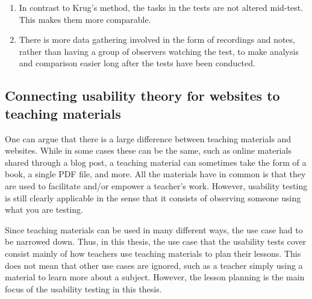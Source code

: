 \begin{enumerate}
	\item In contrast to Krug's method, the tasks in the tests are not altered mid-test. This makes them more comparable.
	\item There is more data gathering involved in the form of recordings and notes, rather than having a group of observers watching the test, to make analysis and comparison easier long after the tests have been conducted.
\end{enumerate}

\subsection{Connecting usability theory for websites to teaching materials}

One can argue that there is a large difference between teaching materials and websites. While in some cases these can be the same, such as online materials shared through a blog post, a teaching material can sometimes take the form of a book, a single PDF file, and more. All the materials have in common is that they are used to facilitate and/or empower a teacher's work. However, usability testing is still clearly applicable in the sense that it consists of observing someone using what you are testing.

Since teaching materials can be used in many different ways, the use case had to be narrowed down. Thus, in this thesis, the use case that the usability tests cover consist mainly of how teachers use teaching materials to plan their lessons. This does not mean that other use cases are ignored, such as a teacher simply using a material to learn more about a subject. However, the lesson planning is the main focus of the usability testing in this thesis.

